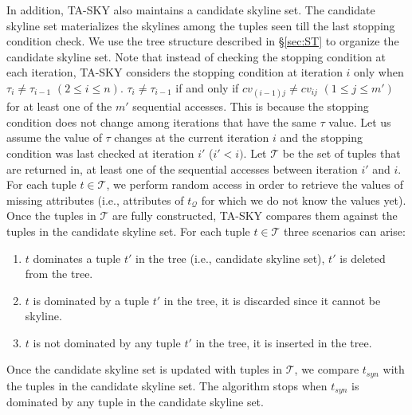In addition, TA-SKY also maintains a candidate skyline set. The candidate skyline set materializes the skylines among the tuples seen till the last stopping condition check. We use the tree structure described in \S\ref{sec:ST} to organize the candidate skyline set. Note that instead of checking the stopping condition at each iteration, TA-SKY considers the stopping condition at iteration $i$ only when $\tau_i \neq \tau_{i-1}$ $(2 \leq i \leq n)$.  $\tau_i \neq \tau_{i-1}$ if and only if $cv_{(i-1)j} \neq cv_{ij}$ $(1 \leq j \leq m')$ for at least one of the $m'$ sequential accesses. This is because the stopping condition does not change among iterations that have the same $\tau$ value. Let us assume the value of $\tau$ changes at the current iteration $i$ and the stopping condition was last checked at iteration $i'$ ($i' < i)$. Let $\mathcal{T}$ be the set of tuples that are returned in, at least one of the sequential accesses between iteration $i'$ and $i$. For each tuple $t \in \mathcal{T}$, we perform random access in order to retrieve the values of missing attributes (i.e., attributes of $t_\mathcal{Q}$ for which we do not know the values yet). Once the tuples in $\mathcal{T}$ are fully constructed, TA-SKY compares them against the tuples in the candidate skyline set. For each tuple $t \in \mathcal{T}$  three scenarios can arise:
\begin{enumerate}
    \itemsep0em
    \item $t$ dominates a tuple $t'$ in the tree (i.e., candidate skyline set), $t'$ is deleted from the tree.
    \item $t$ is dominated by a tuple $t'$ in the tree, it is discarded since it cannot be skyline.
    \item $t$ is not dominated by any tuple $t'$ in the tree, it is inserted in the tree.
\end{enumerate}

Once the candidate skyline set is updated with tuples in $\mathcal{T}$, we compare $t_{syn}$ with the tuples in the candidate skyline set. The algorithm stops when $t_{syn}$ is dominated by any tuple in the candidate skyline set.

